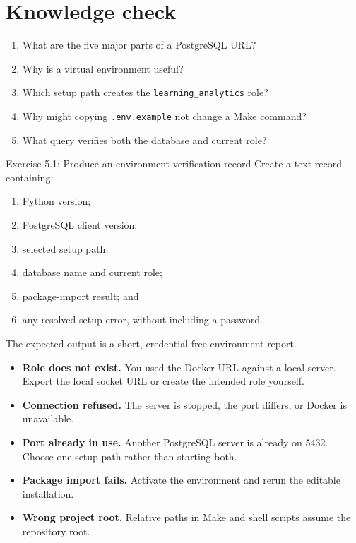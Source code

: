 \section{Knowledge check}

\begin{enumerate}
  \item What are the five major parts of a PostgreSQL URL?
  \item Why is a virtual environment useful?
  \item Which setup path creates the \texttt{learning\_analytics} role?
  \item Why might copying \texttt{.env.example} not change a Make command?
  \item What query verifies both the database and current role?
\end{enumerate}

\begin{exercisebox}{Exercise 5.1: Produce an environment verification record}
Create a text record containing:
\begin{enumerate}
  \item Python version;
  \item PostgreSQL client version;
  \item selected setup path;
  \item database name and current role;
  \item package-import result; and
  \item any resolved setup error, without including a password.
\end{enumerate}
The expected output is a short, credential-free environment report.
\end{exercisebox}

\begin{commonmistakes}
\begin{itemize}
  \item \textbf{Role does not exist.} You used the Docker URL against a local
    server. Export the local socket URL or create the intended role yourself.
  \item \textbf{Connection refused.} The server is stopped, the port differs, or
    Docker is unavailable.
  \item \textbf{Port already in use.} Another PostgreSQL server is already on
    5432. Choose one setup path rather than starting both.
  \item \textbf{Package import fails.} Activate the environment and rerun the
    editable installation.
  \item \textbf{Wrong project root.} Relative paths in Make and shell scripts
    assume the repository root.
\end{itemize}
\end{commonmistakes}

